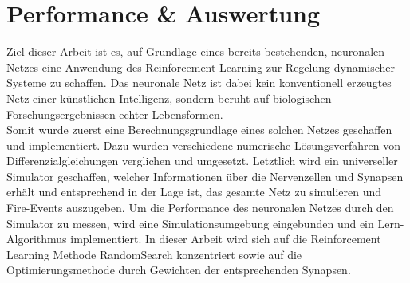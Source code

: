 %
\chapter{Performance \& Auswertung}
\label{chap:erg}
%
	Ziel dieser Arbeit ist es, auf Grundlage eines bereits bestehenden, neuronalen Netzes eine Anwendung des Reinforcement Learning zur Regelung dynamischer Systeme zu schaffen. Das neuronale Netz ist dabei kein konventionell erzeugtes Netz einer künstlichen Intelligenz, sondern beruht auf biologischen Forschungsergebnissen echter Lebensformen.\\
	Somit wurde zuerst eine Berechnungsgrundlage eines solchen Netzes geschaffen und implementiert. Dazu wurden verschiedene numerische Lösungsverfahren von Differenzialgleichungen verglichen und umgesetzt. Letztlich wird ein universeller Simulator geschaffen, welcher Informationen über die Nervenzellen und Synapsen erhält und entsprechend in der Lage ist, das gesamte Netz zu simulieren und Fire-Events auszugeben. Um die Performance des neuronalen Netzes durch den Simulator zu messen, wird eine Simulationsumgebung eingebunden und ein Lern-Algorithmus implementiert. In dieser Arbeit wird sich auf die Reinforcement Learning Methode RandomSearch konzentriert sowie auf die Optimierungsmethode durch Gewichten der entsprechenden Synapsen.


